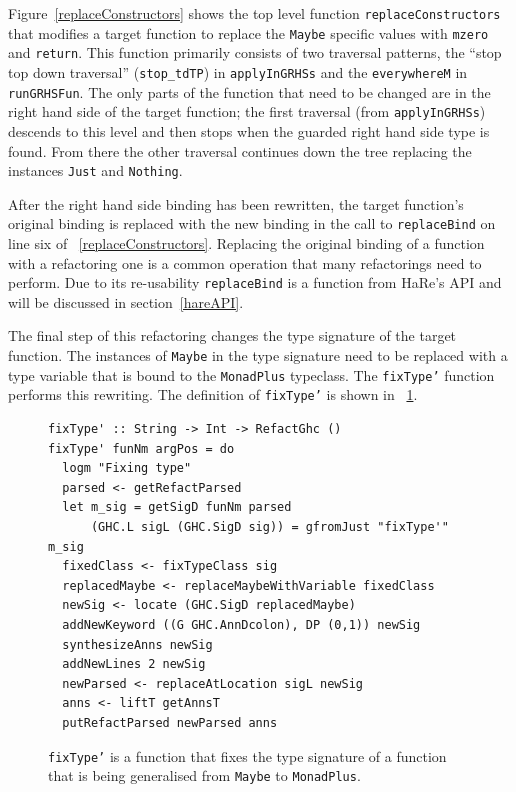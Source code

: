 Figure~\ref{replaceConstructors} shows the top level function \texttt{replaceConstructors} that modifies a target function to replace the \texttt{Maybe} specific values with \texttt{mzero} and \texttt{return}. This function primarily consists of two traversal patterns, the ``stop top down traversal'' (\texttt{stop\_tdTP}) in \texttt{applyInGRHSs} and the \texttt{everywhereM} in \texttt{runGRHSFun}. The only parts of the function that need to be changed are in the right hand side of the target function; the first traversal (from \texttt{applyInGRHSs}) descends to this level and then stops when the guarded right hand side type is found. From there the other traversal continues down the tree replacing the instances \texttt{Just} and \texttt{Nothing}.

After the right hand side binding has been rewritten, the target function's original binding is replaced with the new binding in the call to \texttt{replaceBind} on line six of \DIFdelbegin {}\DIFdelend \DIFaddbegin {}\DIFaddend ~\ref{replaceConstructors}. Replacing the original binding of a function with a refactoring one is a common operation that many refactorings need to perform. Due to its re-usability \texttt{replaceBind} is a function from HaRe's API and will be discussed in section~\ref{hareAPI}. 

The final step of this refactoring changes the type signature of the target function. The instances of \texttt{Maybe} in the type signature need to be replaced with a type variable that is bound to the \texttt{MonadPlus} typeclass. The \texttt{fixType'} function performs this rewriting. The definition of \texttt{fixType'} is shown in \DIFdelbegin {}\DIFdelend \DIFaddbegin {}\DIFaddend ~\ref{fixTypePrime}.

\begin{figure}[t]
\begin{lstlisting}
fixType' :: String -> Int -> RefactGhc ()
fixType' funNm argPos = do
  logm "Fixing type"
  parsed <- getRefactParsed
  let m_sig = getSigD funNm parsed
      (GHC.L sigL (GHC.SigD sig)) = gfromJust "fixType'" m_sig
  fixedClass <- fixTypeClass sig
  replacedMaybe <- replaceMaybeWithVariable fixedClass
  newSig <- locate (GHC.SigD replacedMaybe)
  addNewKeyword ((G GHC.AnnDcolon), DP (0,1)) newSig
  synthesizeAnns newSig
  addNewLines 2 newSig
  newParsed <- replaceAtLocation sigL newSig
  anns <- liftT getAnnsT
  putRefactParsed newParsed anns         
\end{lstlisting}
\caption{\texttt{fixType'} is a function that fixes the type signature of a function that is being generalised from \texttt{Maybe} to \texttt{MonadPlus}.}
\label{fixTypePrime}
\end{figure}

